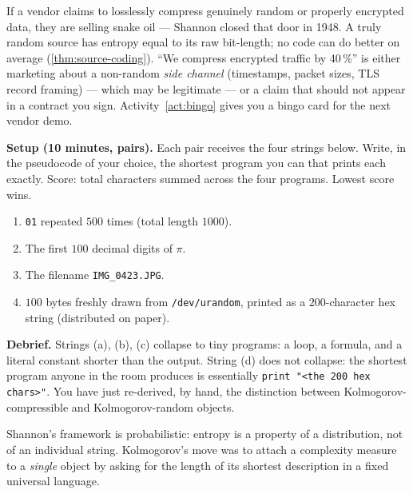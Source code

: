 \documentclass[12pt,a4paper]{article}
\theoremstyle{plain}
\theoremstyle{definition}
\begin{document}
\begin{intuition}[title={The compression sniff test}]
If a vendor claims to losslessly compress genuinely random or properly
encrypted data, they are selling snake oil --- Shannon closed that
door in 1948.  A truly random source has entropy equal to its raw
bit-length; no code can do better on average
(\cref{thm:source-coding}).  ``We compress encrypted traffic by
40\,\%'' is either marketing about a non-random \emph{side channel}
(timestamps, packet sizes, TLS record framing) --- which may be
legitimate --- or a claim that should not appear in a contract you
sign.  Activity~\ref{act:bingo} gives you a bingo card for the next
vendor demo.
\end{intuition}

\begin{activity}[title={Activity 1 --- Shortest-recipe game}]
\label{act:recipe}
\textbf{Setup (10 minutes, pairs).}  Each pair receives the four
strings below.  Write, in the pseudocode of your choice, the shortest
program you can that prints each exactly.  Score: total characters
summed across the four programs.  Lowest score wins.

\begin{enumerate}[label=(\alph*),leftmargin=*]
  \item \texttt{01} repeated $500$ times (total length $1000$).
  \item The first $100$ decimal digits of $\pi$.
  \item The filename \texttt{IMG\_0423.JPG}.
  \item $100$ bytes freshly drawn from \texttt{/dev/urandom},
        printed as a $200$-character hex string (distributed on paper).
\end{enumerate}

\textbf{Debrief.}  Strings (a), (b), (c) collapse to tiny programs: a
loop, a formula, and a literal constant shorter than the output.
String (d) does not collapse: the shortest program anyone in the room
produces is essentially \texttt{print "<the 200 hex chars>"}.  You
have just re-derived, by hand, the distinction between
Kolmogorov-compressible and Kolmogorov-random objects.
\end{activity}

Shannon's framework is probabilistic: entropy is a property of a
distribution, not of an individual string.  Kolmogorov's move
\citep{kolmogorov1965three} was to attach a complexity measure to a
\emph{single} object by asking for the length of its shortest
description in a fixed universal language.
\end{document}
